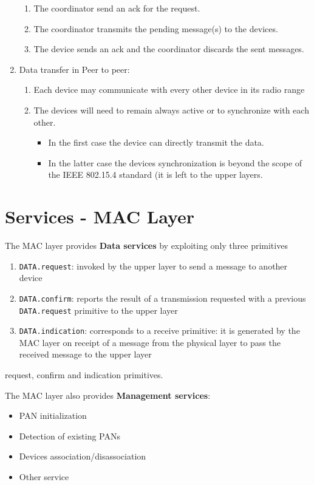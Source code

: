 \begin{enumerate}
\begin{enumerate}
      \item The coordinator send an ack for the request.
      \item The coordinator transmits the pending message(s) to the devices.
      \item The device sends an ack and the coordinator discards the sent messages. 
   \end{enumerate}
   \item Data transfer in Peer to peer:
   \begin{enumerate}
      \item Each device may communicate with every other device in its radio range
      \item The devices will need to remain always active or to synchronize with each other.
      \begin{itemize}
         \item In the first case the device can directly transmit the data.
         \item In the latter case the devices synchronization is beyond the scope of
         the IEEE 802.15.4 standard (it is left to the upper layers.
      \end{itemize}
   \end{enumerate}
\end{enumerate}

\section{Services - MAC Layer}

The MAC layer provides \textbf{Data services} by exploiting only three primitives
\begin{enumerate} 
   \item \texttt{DATA.request}: invoked by the upper layer to send a message to another device  
   \item \texttt{DATA.confirm}: reports the result of a transmission requested with a previous \texttt{DATA.request} primitive to the upper layer 
   \item \texttt{DATA.indication}: corresponds to a receive primitive: it is generated by the MAC layer on receipt of a message from the physical layer to pass the received message to the upper layer
\end{enumerate} request, confirm and indication primitives.
\nl

The MAC layer also provides \textbf{Management services}:
\begin{itemize}
   \item PAN initialization
   \item Detection of existing PANs
   \item Devices association/disassociation
   \item Other service
\end{itemize}

